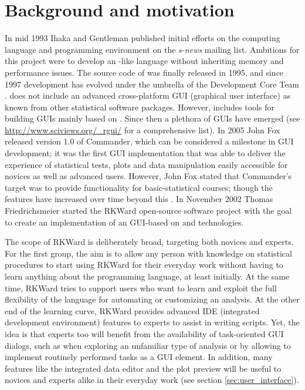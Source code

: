 \section{Background and motivation}
\label{background}
In mid 1993 Ihaka and Gentleman published initial efforts on the computing
language and programming environment  on the \emph{s-news} mailing list. Ambitions for
this project were to develop an -like language without inheriting memory
and performance issues. The source code of  was finally released in 1995, and 
since 1997 development has evolved under the umbrella of the  
Development Core Team \citep{RDCT2001, RDCT2010, Ihaka_Gentlemen_1993}.
 does not include an advanced cross-platform GUI (graphical user interface) as known from other
statistical software packages. However,  includes tools for building GUIs
mainly based on  \citep{Dalgaard2001, Dalgaard2002}. Since then a
plethora of  GUIs have emerged (see \url{http://www.sciviews.org/_rgui/} for a
comprehensive list). In 2005 John Fox released version 1.0 of  Commander, which
can be considered a milestone in  GUI development; it was the first GUI
implementation that was able to deliver the experience of statistical tests,
plots and data manipulation easily accessible for  novices as well as advanced
users. However, John Fox stated that  Commander's target was to provide
functionality for basic-statistical courses; though the features have increased over
time beyond this \citep{Fox2005, Fox2007}. In November 2002 Thomas Friedrichsmeier
started the RKWard open-source software project with the goal to create an
implementation of an  GUI-based on  and  technologies.

The scope of RKWard is deliberately broad, targeting both  novices and experts.
For the first group, the aim is to allow any person with knowledge on
statistical procedures to start using RKWard for their everyday work 
without having to learn anything about the  programming language,
at least initially. At the same time, RKWard tries to support users who want to learn and
exploit the full flexibility of the  language for automating or customizing
an analysis. At the other end of the learning curve, RKWard provides advanced IDE (integrated development environment)
features to  experts to assist in writing  scripts. Yet, the idea
is that  experts too will benefit from the availability of task-oriented GUI
dialogs, such as when exploring an unfamiliar type of analysis
or by allowing to implement routinely performed tasks as a GUI element. In
addition, many features like the integrated data editor and the plot preview 
will be useful to  novices and  experts alike in their everyday work
(see section \ref{sec:user_interface}).

